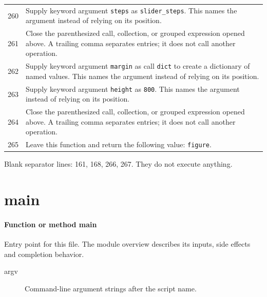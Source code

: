 \documentclass[11pt,a4paper]{book}
\begin{document}
\begin{longtable}{r p{}}
260 & Supply keyword argument \texttt{steps} as \texttt{slider\_steps}. This names the argument instead of relying on its position. \\

261 & Close the parenthesized call, collection, or grouped expression opened above. A trailing comma separates entries; it does not call another operation. \\

262 & Supply keyword argument \texttt{margin} as call \texttt{dict} to create a dictionary of named values. This names the argument instead of relying on its position. \\

263 & Supply keyword argument \texttt{height} as \texttt{800}. This names the argument instead of relying on its position. \\

264 & Close the parenthesized call, collection, or grouped expression opened above. A trailing comma separates entries; it does not call another operation. \\

265 & Leave this function and return the following value: \texttt{figure}. \\

\end{longtable}

Blank separator lines: 161, 168, 266, 267. They do not execute anything.

\section{main}

\paragraph{Function or method main}
Entry point for this file. The module overview describes its inputs, side effects and completion behavior.

\begin{description}
\item[argv] Command-line argument strings after the script name.
\end{description}
\end{document}

